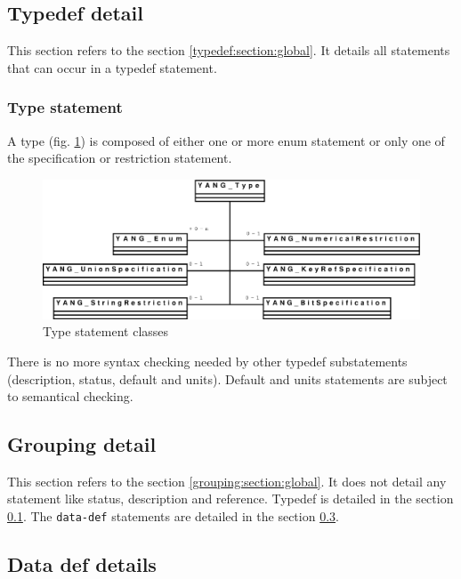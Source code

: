 \documentclass[a4paper]{article}
\begin{document}
\subsection{Typedef detail}
\label{typedef:section:detail}

This  section refers to  the section  \ref{typedef:section:global}. It
details all statements that can occur in a typedef statement.

\subsubsection{Type statement}
\label{type:section:global}

 A  type (fig.  \ref{type}) is  composed of  either one  or  more enum
 statement or only one of the specification or restriction statement.
\begin{figure}[htbp]
\begin{center}
\includegraphics[scale = .3]{type.eps}
\end{center}
\caption{Type statement classes}
\label{type}
\end{figure}

There  is   no  more  syntax   checking  needed  by   other  typedef
substatements  (description, status, default  and units).  Default and
units statements are subject to semantical checking.

\subsection{Grouping detail}
\label{grouping:section:details}

This section  refers to the  section \ref{grouping:section:global}. It
does not  detail any statement  like status, description  and reference.
Typedef is detailed  in the section \ref{typedef:section:detail}.  The
{\tt    data-def}   statements   are    detailed   in    the   section
\ref{datadef:section:detail}.

\subsection{Data def details}
\label{datadef:section:detail}
\end{document}
